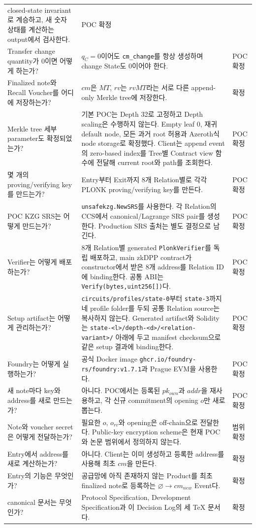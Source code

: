 \documentclass[11pt]{extarticle}
\begin{document}
{\begin{longtable}[]{@{}L{0.24\textwidth}L{0.56\textwidth}L{0.12\textwidth}@{}}
closed-state invariant로 계승하고, 새 숫자 상태를 계산하는 output에서 검사한다. & POC 확정 \\
Transfer change quantity가 0이면 어떻게 하는가? & $q_C=0$이어도
\texttt{cm\_change}를 항상 생성하며 change State도 0이어야 한다. & POC 확정 \\
Finalized note와 Recall Voucher를 어디에 저장하는가? & $cm$은 $MT$, $rv$는
$rvMT$라는 서로 다른 append-only Merkle tree에 저장한다. & 확정 \\
Merkle tree 세부 parameter도 확정되었는가? & 기본 POC는 Depth 32로 고정하고
Depth scaling은 수행하지 않는다. Empty leaf 0, 재귀 default node,
모든 과거 root 허용과 Azeroth식 node storage로 확정했다. Client는 append event의
zero-based index를 Tree별 Contract view 함수에 전달해 current root와 path를 조회한다.
& POC 확정 \\
몇 개의 proving/verifying key를 만드는가? & Entry부터 Exit까지 8개 Relation별로
각각 PLONK proving/verifying key를 만든다. & POC 확정 \\
POC KZG SRS는 어떻게 만드는가? & \texttt{unsafekzg.NewSRS}를 사용한다.
각 Relation의 CCS에서 canonical/Lagrange SRS pair를 생성한다. Production SRS 출처는
별도 결정으로 남긴다. & POC 확정 \\
Verifier는 어떻게 배포하는가? & 8개 Relation별 generated \texttt{PlonkVerifier}를
독립 배포하고, main zkDPP contract가 constructor에서 받은 8개 address를 Relation ID에
binding한다. 공통 ABI는 \texttt{Verify(bytes,uint256[])}다. & POC 확정 \\
Setup artifact는 어떻게 관리하는가? &
\texttt{circuits/profiles/state-0}부터 \texttt{state-3}까지 네 profile folder를 두되
공통 Relation source는 복사하지 않는다. Generated artifact와 Solidity는
\texttt{state-<l>/depth-<d>/<relation-variant>/} 아래에 두고 manifest checksum으로
같은 setup 결과에 binding한다. & POC 확정 \\
Foundry는 어떻게 실행하는가? & 공식 Docker image
\texttt{ghcr.io/foundry-rs/foundry:v1.7.1}과 Prague EVM을 사용한다. & POC 확정 \\
새 note마다 key와 address를 새로 만드는가? & 아니다. POC에서는 등록된
$pk_{own}$과 $addr$을 재사용하고, 각 신규 commitment의 opening $o$만 새로 뽑는다.
& POC 확정 \\
Note와 voucher secret은 어떻게 전달하는가? & 필요한 $o$, $o_{rv}$와 opening은
off-chain으로 전달한다. Public-key encryption scheme은 현재 POC와 논문 범위에서
정의하지 않는다. & 범위 확정 \\
Entry에서 address를 새로 계산하는가? & 아니다. Client는 이미 생성하고 등록한
address를 사용해 최초 $cm$을 만든다. & 확정 \\
Entry의 기능은 무엇인가? & 공급망에 아직 존재하지 않는 Product를 최초 finalized
note로 등록하는 $\varnothing\rightarrow cm_{new}$ Event다. & 확정 \\
canonical 문서는 무엇인가? & Protocol Specification, Development
Specification과 이 Decision Log의 세 TeX 문서다. & 확정 \\
\end{longtable}
}
\end{document}
